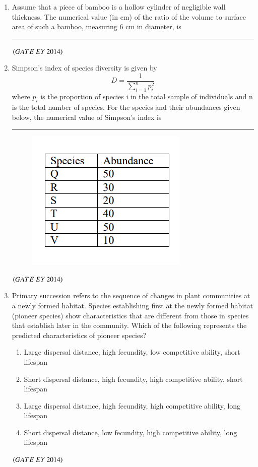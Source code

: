 \documentclass[journal]{IEEEtran}
\numberwithin{equation}{enumi}
\numberwithin{figure}{enumi}
\begin{document}
\begin{enumerate}
    \item Assume that a piece of bamboo is a hollow cylinder of negligible wall thickness. The numerical value (in cm) of the ratio of the volume to surface area of such a bamboo, measuring 6 cm in diameter, is \rule{3cm}{0.15mm}
    \hfill{$\brak{ GATE\ EY\ 2014}$}
    \bigskip

    \item Simpson's index of species diversity is given by
    $$D = \frac{1}{\sum_{i=1}^{n} p_i^2}$$
    where $p_i$ is the proportion of species i in the total sample of individuals and n is the total number of species. For the species and their abundances given below, the numerical value of Simpson's index is \rule{3cm}{0.15mm}
    \begin{figure}[H]
    \centering
    \includegraphics[width=0.7\columnwidth]{figs/18.png}
    \caption{}
    \label{fig:18}
   \end{figure}
    \hfill{$\brak{ GATE\ EY\ 2014}$}
    \bigskip

    \item Primary succession refers to the sequence of changes in plant communities at a newly formed habitat. Species establishing first at the newly formed habitat (pioneer species) show characteristics that are different from those in species that establish later in the community. Which of the following represents the predicted characteristics of pioneer species?
    \begin{enumerate}
        \item Large dispersal distance, high fecundity, low competitive ability, short lifespan
        \item Short dispersal distance, high fecundity, high competitive ability, short lifespan
        \item Large dispersal distance, high fecundity, high competitive ability, long lifespan
        \item Short dispersal distance, low fecundity, high competitive ability, long lifespan
    \end{enumerate}
    \hfill{$\brak{ GATE\ EY\ 2014}$}
    \bigskip


\end{enumerate}
\end{document}
